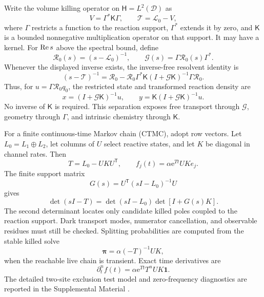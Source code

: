 \documentclass[aps,pre,reprint,amsmath,amssymb,longbibliography,floatfix]{revtex4-2}
\newcommand{\e}{\mathrm e}
\newcommand{\Tgen}{\mathcal T}
\newcommand{\Lfree}{\mathcal L_0}
\newcommand{\Rfree}{\mathcal R_0}
\newcommand{\Gres}{\mathcal G}
\begin{document}
Write the volume killing operator on
\(\mathsf H=L^2(\mathcal D)\) as
\begin{equation}
V=\Gamma^*\mathsf K\Gamma,\qquad
\Tgen=\Lfree-V,
\label{eq:killed-operator}
\end{equation}
where \(\Gamma\) restricts a function to the reaction support,
\(\Gamma^*\) extends it by zero, and \(\mathsf K\) is a bounded nonnegative
multiplication operator on that support. It may have a kernel. For
\({\rm Re}\,s\) above the spectral bound, define
\begin{equation}
\Rfree(s)=(s-\Lfree)^{-1},\qquad
\Gres(s)=\Gamma\Rfree(s)\Gamma^*.
\label{eq:restricted-green}
\end{equation}
Whenever the displayed inverse exists, the inverse-free resolvent identity is
\begin{equation}
(s-\Tgen)^{-1}
=\Rfree-\Rfree\Gamma^*\mathsf K
 (I+\Gres\mathsf K)^{-1}\Gamma\Rfree.
\label{eq:woodbury-operator}
\end{equation}
Thus, for \(u=\Gamma\Rfree q_0\), the restricted state and transformed
reaction density are
\begin{equation}
x=(I+\Gres\mathsf K)^{-1}u,\qquad
y=\mathsf K(I+\Gres\mathsf K)^{-1}u.
\label{eq:support-density}
\end{equation}
No inverse of \(\mathsf K\) is required. This separation exposes free
transport through \(\Gres\), geometry through \(\Gamma\), and intrinsic
chemistry through \(\mathsf K\).

For a finite continuous-time Markov chain (CTMC), adopt row vectors. Let
\(L_0=L_1\oplus L_2\), let columns of \(U\) select reactive states, and let
\(K\) be diagonal in channel rates. Then
\begin{equation}
T=L_0-UKU^\mathsf T,\qquad
f_j(t)=\alpha\e^{Tt}UKe_j.
\label{eq:finite-channel}
\end{equation}
The finite support matrix
\[
G(s)=U^\mathsf T(sI-L_0)^{-1}U
\]
gives
\[
\det(sI-T)=\det(sI-L_0)\det[I+G(s)K].
\]
The second determinant locates only candidate killed poles coupled to the
reaction support. Dark transport modes, numerator cancellation, and
observable residues must still be checked. Splitting probabilities are
computed from the stable killed solve
\begin{equation}
\bm\pi=\alpha(-T)^{-1}UK,
\label{eq:splitting-killed}
\end{equation}
when the reachable live chain is transient. Exact time derivatives are
\begin{equation}
\partial_t^n f(t)=\alpha\e^{Tt}T^nUK\bm1.
\label{eq:time-derivatives}
\end{equation}
The detailed two-site exclusion test model and zero-frequency diagnostics are
reported in the Supplemental Material \cite{supplementalMaterial}.
\end{document}
